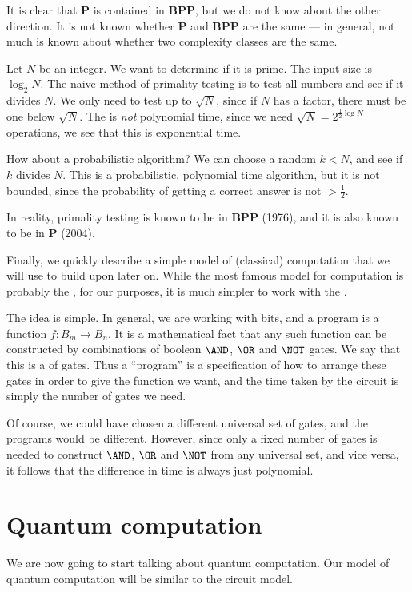 \documentclass[a4paper]{article}
\begin{document}
It is clear that \textbf{P} is contained in \textbf{BPP}, but we do not know about the other direction. It is not known whether \textbf{P} and \textbf{BPP} are the same --- in general, not much is known about whether two complexity classes are the same.

\begin{eg}
  Let $N$ be an integer. We want to determine if it is prime. The input size is $\log_2 N$. The naive method of primality testing is to test all numbers and see if it divides $N$. We only need to test up to $\sqrt{N}$, since if $N$ has a factor, there must be one below $\sqrt{N}$. The is \emph{not} polynomial time, since we need $\sqrt{N} = 2^{\frac{1}{2} \log N}$ operations, we see that this is exponential time.

  How about a probabilistic algorithm? We can choose a random $k < N$, and see if $k$ divides $N$. This is a probabilistic, polynomial time algorithm, but it is not bounded, since the probability of getting a correct answer is not $> \frac{1}{2}$.

  In reality, primality testing is known to be in \textbf{BPP} (1976), and it is also known to be in \textbf{P} (2004).
\end{eg}

Finally, we quickly describe a simple model of (classical) computation that we will use to build upon later on. While the most famous model for computation is probably the , for our purposes, it is much simpler to work with the .

The idea is simple. In general, we are working with bits, and a program is a function $f: B_m \to B_n$. It is a mathematical fact that any such function can be constructed by combinations of boolean $\AND$, $\OR$ and $\NOT$ gates. We say that this is a  of gates. Thus a ``program'' is a specification of how to arrange these gates in order to give the function we want, and the time taken by the circuit is simply the number of gates we need.

Of course, we could have chosen a different universal set of gates, and the programs would be different. However, since only a fixed number of gates is needed to construct $\AND$, $\OR$ and $\NOT$ from any universal set, and vice versa, it follows that the difference in time is always just polynomial.

\section{Quantum computation}
We are now going to start talking about quantum computation. Our model of quantum computation will be similar to the circuit model.
\end{document}
